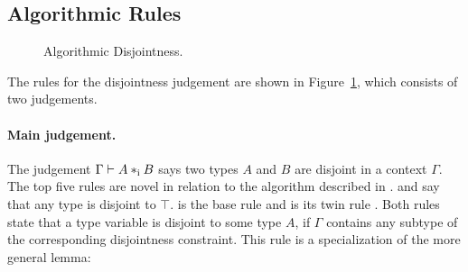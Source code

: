 \subsection{Algorithmic Rules}


\begin{figure}[!t]


  \caption{Algorithmic Disjointness.}
  \label{fig:disjointness}
\end{figure}


The rules for the disjointness judgement are shown in
Figure~\ref{fig:disjointness}, which consists of two judgements.
 
\paragraph{Main judgement.} The judgement $\Gamma \vdash A *_\textnormal{i} B$ says
two types $A$ and $B$ are disjoint in a context $\Gamma$.
The top five rules are novel in relation to the algorithm described in \oldname.
 and  say that any type is disjoint to 
$\top$.
 is the base rule and  is its twin rule 
. 
Both rules state that a type variable is disjoint to some type $A$, if $\Gamma$ contains any
subtype of the corresponding disjointness constraint. 
This rule is a specialization of the more general lemma:

